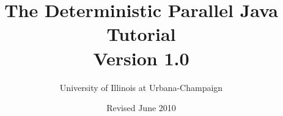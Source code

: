 \documentclass[10pt]{article}
\title{\bfseries{The Deterministic Parallel Java 
    Tutorial \\
Version 1.0}}
\author{University of Illinois at Urbana-Champaign}
\date{Revised June 2010}
\begin{document}
\maketitle

\tableofcontents{}

\begin{sloppypar}






\end{sloppypar}
\end{document}
